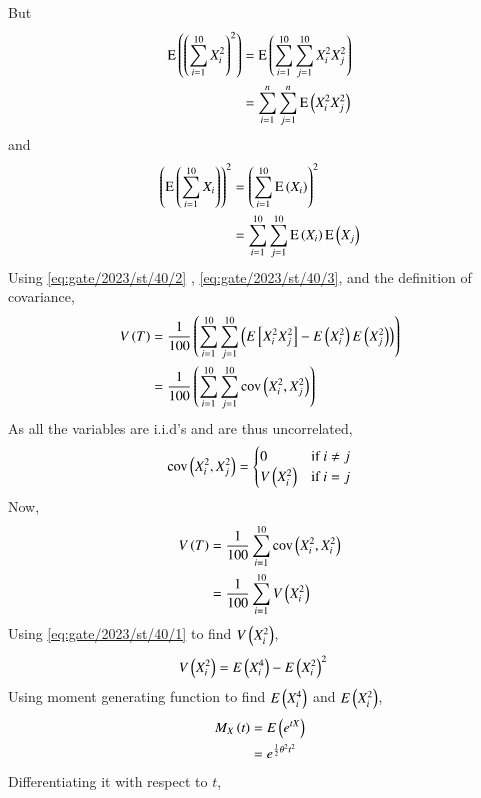 \documentclass[journal,12pt,onecolumn]{IEEEtran}
\theoremstyle{remark}
\begin{document}
But
\begin{align}
    \text{E}\left(\left(\sum_{i=1}^{10} X_i^2\right)^2\right) &= \text{E}\left(\sum_{i=1}^{10} \sum_{j=1}^{10} X_i^2X_j^2\right)\\
    &= \sum_{i=1}^{n} \sum_{j=1}^{n} \text{E}\left(X_i^2X_j^2\right) \label{eq:gate/2023/st/40/2}
\end{align}
and 
\begin{align}
    \left(\text{E}\left(\sum_{i=1}^{10} X_i\right)\right)^2 &= \left(\sum_{i=1}^{10} \text{E}\left(X_i\right)\right)^2\\
    &= \sum_{i=1}^{10} \sum_{j=1}^{10} \text{E}\left(X_i\right) \text{E}\left(X_j\right) \label{eq:gate/2023/st/40/3}
\end{align}
Using \eqref{eq:gate/2023/st/40/2} , \eqref{eq:gate/2023/st/40/3}, and the definition of covariance,
\begin{align}
	V\left(T\right) &= \frac{1}{100} \left(\sum_{i=1}^{10} \sum_{j=1}^{10} \left(E{}\left[X_i^2X_j^2\right] - E\left(X_i^2\right) E\left(X_j^2\right)\right)\right)\\
    &= \frac{1}{100} \left(\sum_{i=1}^{10} \sum_{j=1}^{10} \text{cov}\left(X_i^2, X_j^2\right)\right)
\end{align}
As all the variables are i.i.d's and are thus uncorrelated,
\begin{align}
    \text{cov}\left(X_i^2, X_j^2\right) = 
    \begin{cases}
        0 & \text{if } i \ne j\\
        V\left(X_i^2\right) & \text{if } i = j
    \end{cases} \label{eq:st_32_2023_5}
\end{align}
Now,
\begin{align}
	V\left(T\right) &= \frac{1}{100}\sum^{10}_{i=1}{\text{cov}\left(X_i^2,X_i^2\right)}\\
	&= \frac{1}{100}\sum^{10}_{i=1}{V\left(X^2_i\right)}
\end{align}
Using \eqref{eq:gate/2023/st/40/1} to find $V\left(X_i^2\right)$,
\begin{align}
	V\left(X^2_i\right) &= E\left(X^4_i\right) - E\left(X^2_i\right)^2
\end{align}
Using moment generating function to find $E\left(X_i^4\right)$ and $E\left(X_i^2\right)$,
\begin{align}
	M_X\left(t\right) &= E\left(e^{tX}\right)\\
	&= e^{\frac{1}{2}\theta^2t^2}
\end{align}
Differentiating it with respect to $t$,
\end{document}
